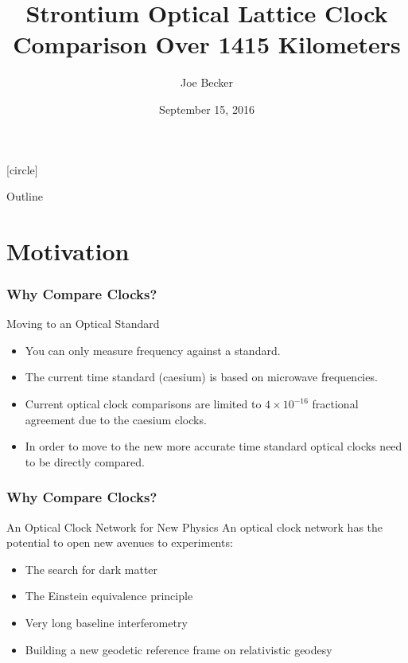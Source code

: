 \documentclass{beamer}
\title[OSA News]{Strontium Optical Lattice Clock Comparison Over 1415 Kilometers}
\author[J. Becker]{Joe Becker}
\institute[Texas A\&M]{Texas A\&M Department of Physics and Astronomy

\medskip
\textit{jbecker@physics.tamu.edu} %
}
\date{September 15, 2016} %
\begin{document}
[circle]

\begin{frame}
\titlepage 
\end{frame}

\begin{frame}{Outline}
    \tableofcontents
\end{frame}

\section{Motivation} 
\begin{frame}\frametitle{Why Compare Clocks?}
    \begin{block}{Moving to an Optical Standard}
        \begin{itemize}
            \item You can only measure frequency against a standard.
            \item The current time standard (caesium) is based on microwave frequencies.
            \item Current optical clock comparisons are limited to $4\times10^{-16}$ fractional agreement due to the caesium clocks. 
            \item In order to move to the new more accurate time standard optical clocks need to be directly compared.
        \end{itemize}
    \end{block}
\end{frame}

\begin{frame}\frametitle{Why Compare Clocks?}
    \begin{block}{An Optical Clock Network for New Physics}
        An optical clock network has the potential to open new avenues to experiments:
        \begin{itemize}
            \item The search for dark matter
            \item The Einstein equivalence principle 
            \item Very long baseline interferometry
            \item Building a new geodetic reference frame on relativistic geodesy
        \end{itemize}
    \end{block}
\end{frame}
\end{document}
